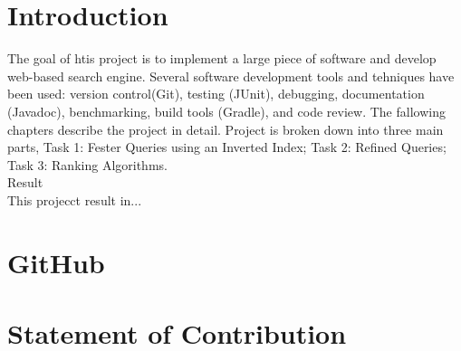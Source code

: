\section{Introduction}
\label{sec:Introduction}
The goal of htis project is to implement a large piece of software and develop web-based search engine. Several software development
tools and tehniques have been used: version control(Git), testing (JUnit), debugging, documentation (Javadoc), benchmarking, build
tools (Gradle), and code review. The fallowing chapters describe the project in detail. Project is broken down into three main parts,
Task 1: Fester Queries using an Inverted Index; Task 2: Refined Queries; Task 3: Ranking Algorithms.\\
Result\\
This projecct result in...\\

\section{GitHub}
\label{sec:GitHub}

\section{Statement of Contribution}
\label{sec:Statement of Contribution}
